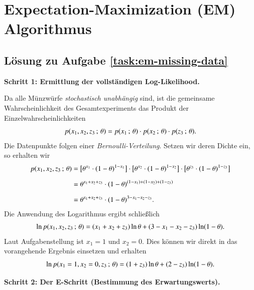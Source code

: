 \section{Expectation-Maximization (EM) Algorithmus}

\subsection*{Lösung zu Aufgabe \ref{task:em-missing-data}}

\textbf{Schritt 1: Ermittlung der vollständigen Log-Likelihood.}

Da alle Münzwürfe \textit{stochastisch unabhängig} sind, ist die gemeinsame Wahrscheinlichkeit des Gesamtexperiments das Produkt der Einzelwahrscheinlichkeiten
\begin{equation*}
	p(x_1, x_2, z_3 \,;\, \theta)
		= p(x_1 \,;\, \theta) \cdot p(x_2 \,;\, \theta) \cdot p(z_3 \,;\, \theta).
\end{equation*}
Die Datenpunkte folgen einer \textit{Bernoulli-Verteilung}. Setzen wir deren Dichte ein, so erhalten wir
\begin{align*}
	p(x_1, x_2, z_3 \,;\, \theta)
		&= \bigl[ \theta^{x_1} \cdot (1 - \theta)^{1 - x_1} \bigr]
			\cdot \bigl[ \theta^{x_2} \cdot (1 - \theta)^{1 - x_2} \bigr]
			\cdot \bigl[ \theta^{z_3} \cdot (1 - \theta)^{1 - z_3} \bigr]
\\[2mm]
		&= \theta^{x_1 + x_2 + z_3} \cdot (1 - \theta)^{(1 - x_1) + (1 - x_2) + (1 - z_3)}
\\[2mm]
		&= \theta^{x_1 + x_2 + z_3} \cdot (1 - \theta)^{3 - x_1 - x_2 - z_3}.
\end{align*}
Die Anwendung des Logarithmus ergibt schließlich
\begin{equation*}
	\ln p(x_1, x_2, z_3 \,;\, \theta)
		= (x_1 + x_2 + z_3) \ln \theta + (3 - x_1 - x_2 - z_3) \ln(1 - \theta).
\end{equation*}
Laut Aufgabenstellung ist $x_1 = 1$ und $x_2 = 0$. Dies können wir direkt in das vorangehende Ergebnis einsetzen und erhalten
\begin{equation*}
	\ln p(x_1 = 1, x_2 = 0, z_3 \,;\, \theta)
		= (1 + z_3) \ln \theta + (2 - z_3) \ln(1 - \theta).
\end{equation*}

\textbf{Schritt 2: Der E-Schritt (Bestimmung des Erwartungswerts).}

